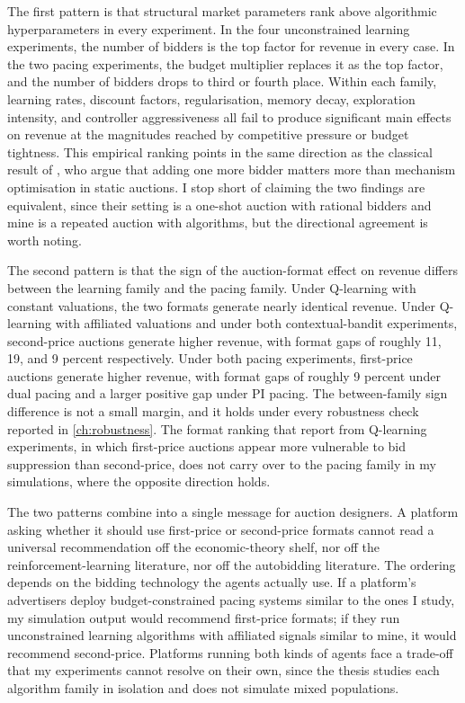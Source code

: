 The first pattern is that structural market parameters rank above algorithmic hyperparameters in every experiment. In the four unconstrained learning experiments, the number of bidders is the top factor for revenue in every case. In the two pacing experiments, the budget multiplier replaces it as the top factor, and the number of bidders drops to third or fourth place. Within each family, learning rates, discount factors, regularisation, memory decay, exploration intensity, and controller aggressiveness all fail to produce significant main effects on revenue at the magnitudes reached by competitive pressure or budget tightness. This empirical ranking points in the same direction as the classical result of \citet{BulowKlemperer1996}, who argue that adding one more bidder matters more than mechanism optimisation in static auctions. I stop short of claiming the two findings are equivalent, since their setting is a one-shot auction with rational bidders and mine is a repeated auction with algorithms, but the directional agreement is worth noting.

The second pattern is that the sign of the auction-format effect on revenue differs between the learning family and the pacing family. Under Q-learning with constant valuations, the two formats generate nearly identical revenue. Under Q-learning with affiliated valuations and under both contextual-bandit experiments, second-price auctions generate higher revenue, with format gaps of roughly 11, 19, and 9 percent respectively. Under both pacing experiments, first-price auctions generate higher revenue, with format gaps of roughly 9 percent under dual pacing and a larger positive gap under PI pacing. The between-family sign difference is not a small margin, and it holds under every robustness check reported in \cref{ch:robustness}. The format ranking that \citet{BanchioSkrzypacz2022} report from Q-learning experiments, in which first-price auctions appear more vulnerable to bid suppression than second-price, does not carry over to the pacing family in my simulations, where the opposite direction holds.

The two patterns combine into a single message for auction designers. A platform asking whether it should use first-price or second-price formats cannot read a universal recommendation off the economic-theory shelf, nor off the reinforcement-learning literature, nor off the autobidding literature. The ordering depends on the bidding technology the agents actually use. If a platform's advertisers deploy budget-constrained pacing systems similar to the ones I study, my simulation output would recommend first-price formats; if they run unconstrained learning algorithms with affiliated signals similar to mine, it would recommend second-price. Platforms running both kinds of agents face a trade-off that my experiments cannot resolve on their own, since the thesis studies each algorithm family in isolation and does not simulate mixed populations.

